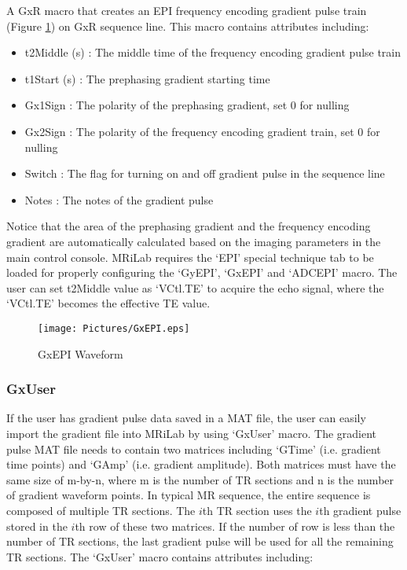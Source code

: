 \documentclass{book}%
\begin{document}
A GxR macro that creates an EPI frequency encoding gradient pulse train (Figure \ref{fig:GxEPI}) on GxR sequence line. This macro contains attributes including:

\begin{itemize}
	\item t2Middle (s) : The middle time of the frequency encoding gradient pulse train
	\item t1Start (s) : The prephasing gradient starting time
	\item Gx1Sign : The polarity of the prephasing gradient, set 0 for nulling
	\item Gx2Sign : The polarity of the frequency encoding gradient train, set 0 for nulling
	\item Switch : The flag for turning on and off gradient pulse in the sequence line
	\item Notes : The notes of the gradient pulse 
\end{itemize}

Notice that the area of the prephasing gradient and the frequency encoding gradient are automatically calculated based on the imaging parameters in the main control console. MRiLab requires the `EPI' special technique tab to be loaded for properly configuring the `GyEPI', `GxEPI' and `ADCEPI' macro. The user can set t2Middle value as `VCtl.TE' to acquire the echo signal, where the `VCtl.TE' becomes the effective TE value.

\begin{figure}[htbp]
	\centering
		\texttt{[image: Pictures/GxEPI.eps]}
	\caption{GxEPI Waveform}
	\label{fig:GxEPI}
\end{figure}

\subsubsection{GxUser}

If the user has gradient pulse data saved in a MAT file, the user can easily import the gradient file into MRiLab by using `GxUser' macro. The gradient pulse MAT file needs to contain two matrices including `GTime' (i.e. gradient time points) and `GAmp' (i.e. gradient amplitude). Both matrices must have the same size of m-by-n, where m is the number of TR sections and n is the number of gradient waveform points. In typical MR sequence, the entire sequence is composed of multiple TR sections. The $i$th TR section uses the $i$th gradient pulse stored in the $i$th row of these two matrices. If the number of row is less than the number of TR sections, the last gradient pulse will be used for all the remaining TR sections. The `GxUser' macro contains attributes including:
\end{document}
